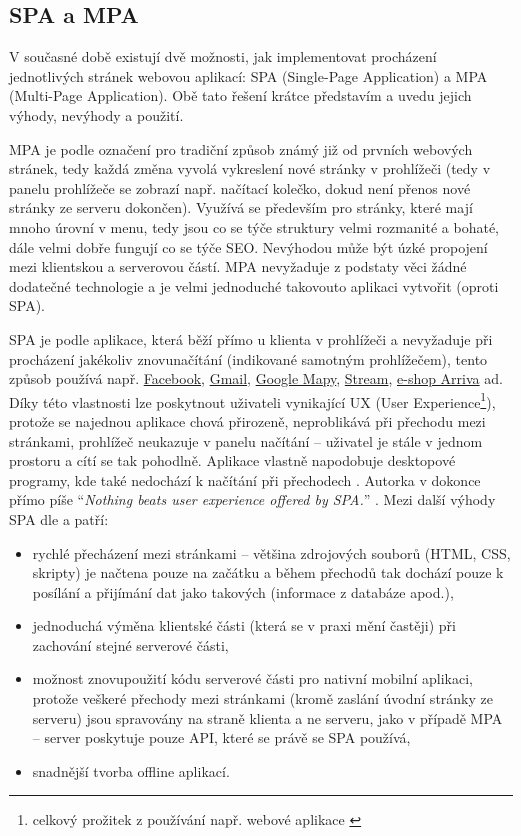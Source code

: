         \subsection{SPA a MPA}\label{spampa}
        V současné době existují dvě možnosti, jak implementovat procházení jednotlivých stránek webovou aplikací: SPA (Single-Page Application) a MPA (Multi-Page Application). Obě tato řešení krátce představím a uvedu jejich výhody, nevýhody a použití.
        
        MPA je podle \cite{spa1} označení pro tradiční způsob známý již od prvních webových stránek, tedy každá změna vyvolá vykreslení nové stránky v prohlížeči (tedy v panelu prohlížeče se zobrazí např. načítací kolečko, dokud není přenos nové stránky ze serveru dokončen). Využívá se především pro stránky, které mají mnoho úrovní v menu, tedy jsou co se týče struktury velmi rozmanité a bohaté, dále velmi dobře fungují co se týče SEO. Nevýhodou může být úzké propojení mezi klientskou a serverovou částí. MPA nevyžaduje z podstaty věci žádné dodatečné technologie a je velmi jednoduché takovouto aplikaci vytvořit (oproti SPA).
        
        SPA je podle \cite{spa1} aplikace, která běží přímo u klienta v prohlížeči a nevyžaduje při procházení jakékoliv znovunačítání (indikované samotným prohlížečem), tento způsob používá např. \href{https://www.facebook.com/}{Facebook}, \href{https://mail.google.com/}{Gmail}, \href{https://www.google.com/maps}{Google Mapy}, \href{https://www.stream.cz/}{Stream}, \href{https://jizdenky.arriva.cz/}{e-shop Arriva} ad. Díky této vlastnosti lze poskytnout uživateli vynikající UX (User Experience\footnote{celkový prožitek z používání např. webové aplikace \cite{ux}}), protože se najednou aplikace chová přirozeně, neproblikává při přechodu mezi stránkami, prohlížeč neukazuje v panelu načítání -- uživatel je stále v jednom prostoru a cítí se tak pohodlně. Aplikace vlastně napodobuje desktopové programy, kde také nedochází k načítání při přechodech \cite{spa2}. Autorka v \cite{spa2} dokonce přímo píše \enquote{\textit{Nothing beats user experience offered by SPA.}} . Mezi další výhody SPA dle \cite{spa1} a \cite{spa2} patří:
        
        \begin{itemize}
            \item rychlé přecházení mezi stránkami -- většina zdrojových souborů (HTML, CSS, skripty) je načtena pouze na začátku a během přechodů tak dochází pouze k posílání a přijímání dat jako takových (informace z databáze apod.),
            \item jednoduchá výměna klientské části (která se v praxi mění častěji) při zachování stejné serverové části,
            \item možnost znovupoužití kódu serverové části pro nativní mobilní aplikaci, protože veškeré přechody mezi stránkami (kromě zaslání úvodní stránky ze serveru) jsou spravovány na straně klienta a ne serveru, jako v případě MPA -- server poskytuje pouze API, které se právě se SPA používá,
            \item snadnější tvorba offline aplikací.
        \end{itemize}
        
